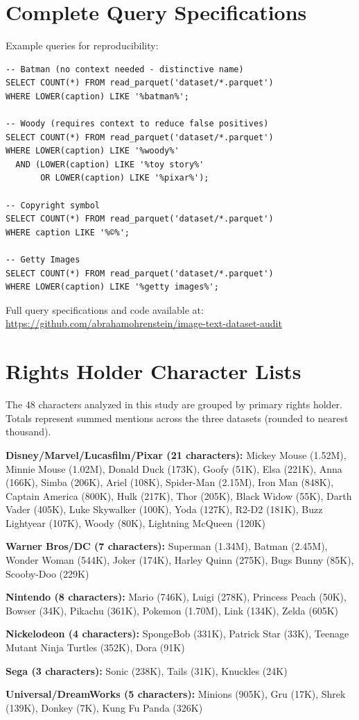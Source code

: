 \documentclass[11pt]{article}
\begin{document}
\appendix

\section{Complete Query Specifications}
\label{app:queries}

Example queries for reproducibility:

\begin{lstlisting}
-- Batman (no context needed - distinctive name)
SELECT COUNT(*) FROM read_parquet('dataset/*.parquet')
WHERE LOWER(caption) LIKE '%batman%';

-- Woody (requires context to reduce false positives)
SELECT COUNT(*) FROM read_parquet('dataset/*.parquet')
WHERE LOWER(caption) LIKE '%woody%' 
  AND (LOWER(caption) LIKE '%toy story%' 
       OR LOWER(caption) LIKE '%pixar%');

-- Copyright symbol
SELECT COUNT(*) FROM read_parquet('dataset/*.parquet')
WHERE caption LIKE '%©%';

-- Getty Images
SELECT COUNT(*) FROM read_parquet('dataset/*.parquet')
WHERE LOWER(caption) LIKE '%getty images%';
\end{lstlisting}

Full query specifications and code available at: \url{https://github.com/abrahamohrenstein/image-text-dataset-audit}

\section{Rights Holder Character Lists}
The 48 characters analyzed in this study are grouped by primary rights holder. Totals represent summed mentions across the three datasets (rounded to nearest thousand).

\textbf{Disney/Marvel/Lucasfilm/Pixar (21 characters):}  
Mickey Mouse (1.52M), Minnie Mouse (1.02M), Donald Duck (173K), Goofy (51K), Elsa (221K), Anna (166K), Simba (206K), Ariel (108K), Spider-Man (2.15M), Iron Man (848K), Captain America (800K), Hulk (217K), Thor (205K), Black Widow (55K), Darth Vader (405K), Luke Skywalker (100K), Yoda (127K), R2-D2 (181K), Buzz Lightyear (107K), Woody (80K), Lightning McQueen (120K)

\textbf{Warner Bros/DC (7 characters):}  
Superman (1.34M), Batman (2.45M), Wonder Woman (544K), Joker (174K), Harley Quinn (275K), Bugs Bunny (85K), Scooby-Doo (229K)

\textbf{Nintendo (8 characters):}  
Mario (746K), Luigi (278K), Princess Peach (50K), Bowser (34K), Pikachu (361K), Pokemon (1.70M), Link (134K), Zelda (605K)

\textbf{Nickelodeon (4 characters):}  
SpongeBob (331K), Patrick Star (33K), Teenage Mutant Ninja Turtles (352K), Dora (91K)

\textbf{Sega (3 characters):}  
Sonic (238K), Tails (31K), Knuckles (24K)

\textbf{Universal/DreamWorks (5 characters):}  
Minions (905K), Gru (17K), Shrek (139K), Donkey (7K), Kung Fu Panda (326K)
\end{document}
